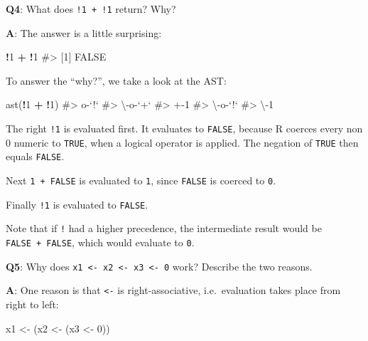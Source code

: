 \documentclass[
]{krantz}
\makeatletter
\newenvironment{Shaded}{\begin{snugshade}}{\end{snugshade}}
\newcommand{\CommentTok}[1]{\textcolor[rgb]{0.56,0.35,0.01}{\textit{#1}}}
\newcommand{\DecValTok}[1]{\textcolor[rgb]{0.00,0.00,0.81}{#1}}
\newcommand{\KeywordTok}[1]{\textcolor[rgb]{0.13,0.29,0.53}{\textbf{#1}}}
\newcommand{\NormalTok}[1]{#1}
\newcommand{\OperatorTok}[1]{\textcolor[rgb]{0.81,0.36,0.00}{\textbf{#1}}}
\newcommand{\StringTok}[1]{\textcolor[rgb]{0.31,0.60,0.02}{#1}}
\newenvironment{kframe}{%
\medskip{}
\setlength{\fboxsep}{.8em}
 \def\at@end@of@kframe{}%
 \ifinner\ifhmode%
  \def\at@end@of@kframe{\end{minipage}}%
  \begin{minipage}{\columnwidth}%
 \fi\fi%
 \def\FrameCommand##1{\hskip\@totalleftmargin \hskip-\fboxsep
 \colorbox{shadecolor}{##1}\hskip-\fboxsep
     \hskip-\linewidth \hskip-\@totalleftmargin \hskip\columnwidth}%
 \MakeFramed {\advance\hsize-\width
   \@totalleftmargin\z@ \linewidth\hsize
   \@setminipage}}%
 {\par\unskip\endMakeFramed%
 \at@end@of@kframe}
\renewenvironment{Shaded}{\begin{kframe}}{\end{kframe}}
\renewcommand{\KeywordTok} [1]{\textcolor[rgb]{0.00,0.44,0.13}{{#1}}}
\renewcommand{\DecValTok}  [1]{\textcolor[rgb]{0.25,0.63,0.44}{{#1}}}
\renewcommand{\StringTok}  [1]{\textcolor[rgb]{0.25,0.44,0.63}{{#1}}}
\renewcommand{\CommentTok} [1]{\textcolor[rgb]{0.38,0.63,0.69}{{#1}}}
\renewcommand{\NormalTok}  [1]{{#1}}
\makeatother
\begin{document}
\textbf{{Q4}}: What does \texttt{!1\ +\ !1} return? Why?

\textbf{{A}}: The answer is a little surprising:

\begin{Shaded}
\begin{Highlighting}[]
\OperatorTok{!}\DecValTok{1} \OperatorTok{+}\StringTok{ }\OperatorTok{!}\DecValTok{1}
\CommentTok{#> [1] FALSE}
\end{Highlighting}
\end{Shaded}

To answer the ``why?'', we take a look at the AST:

\begin{Shaded}
\begin{Highlighting}[]
\KeywordTok{ast}\NormalTok{(}\OperatorTok{!}\DecValTok{1} \OperatorTok{+}\StringTok{ }\OperatorTok{!}\DecValTok{1}\NormalTok{)}
\CommentTok{#> o-`!` }
\CommentTok{#> \textbackslash{}-o-`+` }
\CommentTok{#>   +-1 }
\CommentTok{#>   \textbackslash{}-o-`!` }
\CommentTok{#>     \textbackslash{}-1}
\end{Highlighting}
\end{Shaded}

The right \texttt{!1} is evaluated first. It evaluates to \texttt{FALSE}, because R coerces every non 0 numeric to \texttt{TRUE}, when a logical operator is applied. The negation of \texttt{TRUE} then equals \texttt{FALSE}.

Next \texttt{1\ +\ FALSE} is evaluated to \texttt{1}, since \texttt{FALSE} is coerced to \texttt{0}.

Finally \texttt{!1} is evaluated to \texttt{FALSE}.

Note that if \texttt{!} had a higher precedence, the intermediate result would be \texttt{FALSE\ +\ FALSE}, which would evaluate to \texttt{0}.

\textbf{{Q5}}: Why does \texttt{x1\ \textless{}-\ x2\ \textless{}-\ x3\ \textless{}-\ 0} work? Describe the two reasons.

\textbf{{A}}: One reason is that \texttt{\textless{}-} is right-associative, i.e.~evaluation takes place from right to left:

\begin{Shaded}
\begin{Highlighting}[]
\NormalTok{x1 <-}\StringTok{ }\NormalTok{(x2 <-}\StringTok{ }\NormalTok{(x3 <-}\StringTok{ }\DecValTok{0}\NormalTok{))}
\end{Highlighting}
\end{Shaded}
\end{document}
